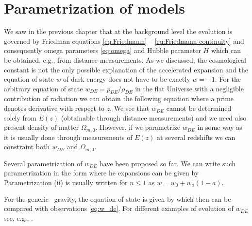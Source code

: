 \section{Parametrization of models}
We saw in the previous chapter that at the background level the evolution is governed by Friedman equations \eqref{eq:Friedmann} -- \eqref{eq:Friedmann-continuity} and consequently omega parameters \eqref{eq:omega} and Hubble parameter $H$ which can be obtained, e.g., from distance measurements. As we discussed, the cosmological constant is not the only possible explanation of the accelerated expansion and the equation of state \(w\) of dark energy does not have to be exactly \(w=-1\). For the arbitrary equation of state $w_{DE}=p_{DE}/\rho_{DE}$ in the flat Universe with a negligible contribution of radiation we can obtain the following equation
where a prime denotes derivative with respect to \(z\). We see that \(w_{DE}\) cannot be determined solely from \(E(z)\) (obtainable through distance measurements) and we need also present density of matter \(\Omega_{m,0}\). However, if we parametrize \(w_{DE}\) in some way as it is usually done through measurements of \(E(z)\) at several redshifts we can constraint both \(w_{DE}\) and \(\Omega_{m,0}\).

Several parametrization  of \(w_{DE}\) have been proposed so far. We can write such parametrization  in the form
where he expansions can be given by
Parametrization (ii) is usually written for \(n\leq1\) as \(w=w_0+w_a(1-a)\).

For the generic \fR\ gravity, the equation of state is given by \parencite{2013qopu.conf...73B}
which then can be compared with observations \eqref{eq:w_de}. For different examples of evolution of $w_{DE}$ see, e.g., \textcite{2020arXiv200707717A}.